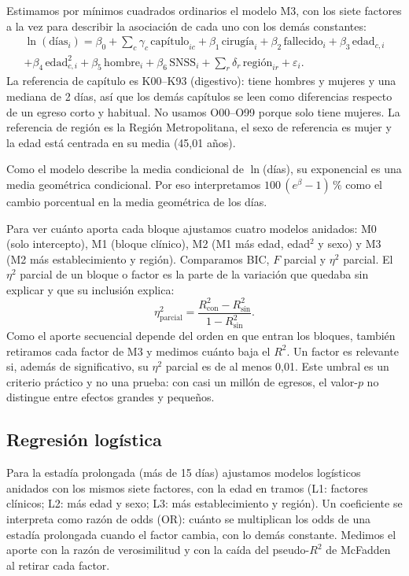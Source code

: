 \documentclass[10.5pt,a4paper,headings=small,abstract=false,bibliography=totoc,listof=totoc]{scrartcl}
\newcommand{\pct}{\,\%}
\begin{document}
Estimamos por mínimos cuadrados ordinarios el modelo M3, con los siete factores a la vez para describir la asociación de cada uno con los demás constantes:
\begin{multline*}
\ln(\text{días}_i)=\beta_0+\sum_c\gamma_c\,\text{capítulo}_{ic}+\beta_1\,\text{cirugía}_i+\beta_2\,\text{fallecido}_i+\beta_3\,\text{edad}_{c,i}\\
+\beta_4\,\text{edad}_{c,i}^2+\beta_5\,\text{hombre}_i+\beta_6\,\text{SNSS}_i+\sum_r\delta_r\,\text{región}_{ir}+\varepsilon_i .
\end{multline*}
La referencia de capítulo es K00--K93 (digestivo): tiene hombres y mujeres y una mediana de 2 días, así que los demás capítulos se leen como diferencias respecto de un egreso corto y habitual. No usamos O00--O99 porque solo tiene mujeres. La referencia de región es la Región Metropolitana, el sexo de referencia es mujer y la edad está centrada en su media (45,01 años).

Como el modelo describe la media condicional de $\ln$(días), su exponencial es una media geométrica condicional. Por eso interpretamos $100\,(e^{\beta}-1)\pct{}$ como el cambio porcentual en la media geométrica de los días.

Para ver cuánto aporta cada bloque ajustamos cuatro modelos anidados: M0 (solo intercepto), M1 (bloque clínico), M2 (M1 más edad, edad$^2$ y sexo) y M3 (M2 más establecimiento y región). Comparamos BIC, $F$ parcial y $\eta^2$ parcial. El $\eta^2$ parcial de un bloque o factor es la parte de la variación que quedaba sin explicar y que su inclusión explica:
\[
\eta^2_{\text{parcial}}=\frac{R^2_{\text{con}}-R^2_{\text{sin}}}{1-R^2_{\text{sin}}}.
\]
Como el aporte secuencial depende del orden en que entran los bloques, también retiramos cada factor de M3 y medimos cuánto baja el $R^2$. Un factor es relevante si, además de significativo, su $\eta^2$ parcial es de al menos 0,01. Este umbral es un criterio práctico y no una prueba: con casi un millón de egresos, el valor-$p$ no distingue entre efectos grandes y pequeños.

\subsection{Regresión logística}

Para la estadía prolongada (más de 15 días) ajustamos modelos logísticos anidados con los mismos siete factores, con la edad en tramos (L1: factores clínicos; L2: más edad y sexo; L3: más establecimiento y región). Un coeficiente se interpreta como razón de odds (OR): cuánto se multiplican los odds de una estadía prolongada cuando el factor cambia, con lo demás constante. Medimos el aporte con la razón de verosimilitud y con la caída del pseudo-$R^2$ de McFadden al retirar cada factor.
\end{document}
